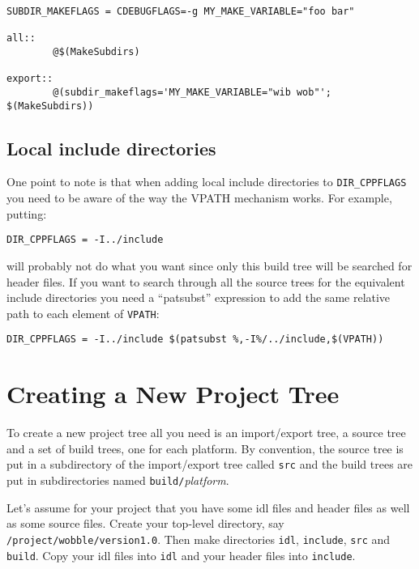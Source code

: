 \documentclass[11pt,twoside,onecolumn]{article}
\begin{document}
{\small \begin{verbatim}
SUBDIR_MAKEFLAGS = CDEBUGFLAGS=-g MY_MAKE_VARIABLE="foo bar"

all::
        @$(MakeSubdirs)

export::
        @(subdir_makeflags='MY_MAKE_VARIABLE="wib wob"'; $(MakeSubdirs))
\end{verbatim}}


\subsection{Local include directories}

One point to note is that when adding local include directories to
\verb|DIR_CPPFLAGS| you need to be aware of the way the VPATH mechanism works.
For example, putting:

{\small \begin{verbatim}
DIR_CPPFLAGS = -I../include
\end{verbatim}}

will probably not do what you want since only this build tree will be searched
for header files.  If you want to search through all the source trees for the
equivalent include directories you need a ``patsubst'' expression to add the
same relative path to each element of {\tt VPATH}:

{\small \begin{verbatim}
DIR_CPPFLAGS = -I../include $(patsubst %,-I%/../include,$(VPATH))
\end{verbatim}}


\section{Creating a New Project Tree}

To create a new project tree all you need is an import/export tree, a source
tree and a set of build trees, one for each platform.  By convention, the
source tree is put in a subdirectory of the import/export tree called {\tt src}
and the build trees are put in subdirectories named {\tt build/}{\it platform}.

Let's assume for your project that you have some idl files and header files as
well as some source files.  Create your top-level directory, say {\small \tt
/project/wobble/version1.0}.  Then make directories {\tt idl}, {\tt include},
{\tt src} and {\tt build}.  Copy your idl files into {\tt idl} and your header
files into {\tt include}.
\end{document}
